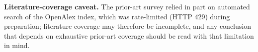 \documentclass[twocolumn]{article}
\begin{document}
\textbf{Literature-coverage caveat.} The prior-art survey relied in part on automated search of the OpenAlex index, which was rate-limited (HTTP 429) during preparation; literature coverage may therefore be incomplete, and any conclusion that depends on exhaustive prior-art coverage should be read with that limitation in mind.


\end{document}
